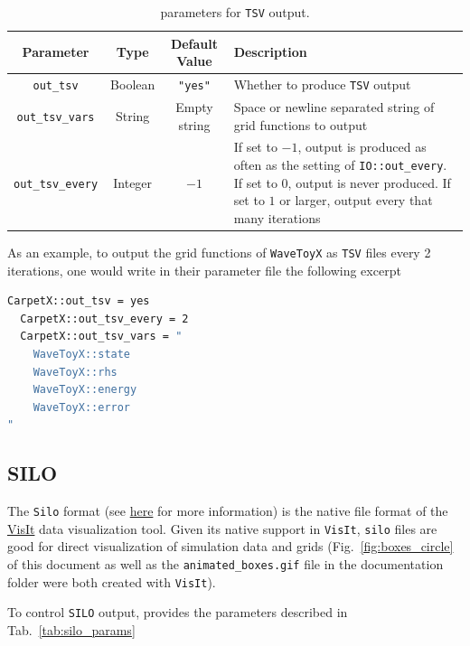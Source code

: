 \begin{table}[ht]
  \centering
  \begin{tabularx}{\textwidth}{cccX}
    Parameter                & Type    & Default Value  & Description \\\hline\hline
    \texttt{out\_tsv}        & Boolean & \texttt{"yes"} & Whether to produce \texttt{TSV} output \\
    \texttt{out\_tsv\_vars}  & String  & Empty string   & Space or newline separated string of grid functions to output \\
    \texttt{out\_tsv\_every} & Integer & $-1$           & If set to $-1$, output is produced as often as the setting of \texttt{IO::out\_every}. If set to $0$, output is never produced. If set to $1$ or larger, output every that many iterations \\\hline\hline
  \end{tabularx}
  \label{tab:tsv_params}
  \caption{\CarpetX\space parameters for \texttt{TSV} output.}
\end{table}

As an example, to output the grid functions of \texttt{WaveToyX} as \texttt{TSV} files every 2 iterations, one would write in their parameter file the following excerpt

\begin{lstlisting}[language=bash]
  CarpetX::out_tsv = yes
  CarpetX::out_tsv_every = 2
  CarpetX::out_tsv_vars = "
    WaveToyX::state
    WaveToyX::rhs
    WaveToyX::energy
    WaveToyX::error
"
\end{lstlisting}

\subsection{SILO}
\label{sec:silo}

The \texttt{Silo} format (see \href{https://visit-sphinx-github-user-manual.readthedocs.io/en/develop/data_into_visit/SiloFormat.html}{here} for more information) is the native file format of the \href{https://sd.llnl.gov/simulation/computer-codes/visit}{VisIt} data visualization tool. Given its native support in \texttt{VisIt}, \texttt{silo} files are good for direct visualization of simulation data and grids (Fig.~\ref{fig:boxes_circle} of this document as well as the \texttt{animated\_boxes.gif} file in the documentation folder were both created with \texttt{VisIt}).

To control \texttt{SILO} output, \CarpetX\space provides the parameters described in Tab.~\ref{tab:silo_params}

